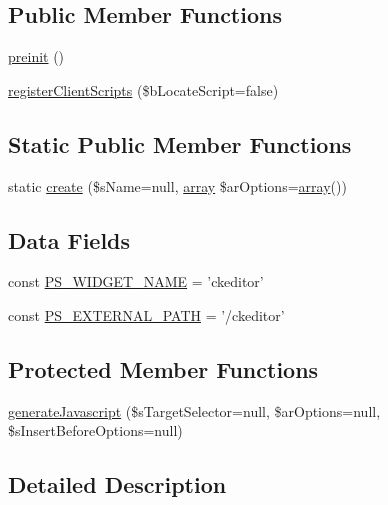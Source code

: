 \subsection*{Public Member Functions}
\begin{DoxyCompactItemize}
\item 
\hyperlink{classCPSCKEditorWidget_a2dc262e99b1c246b56f27626bfe699ff}{preinit} ()
\item 
\hyperlink{classCPSCKEditorWidget_ac02a66bde8e72e4909137bf748edf665}{registerClientScripts} (\$bLocateScript=false)
\end{DoxyCompactItemize}
\subsection*{Static Public Member Functions}
\begin{DoxyCompactItemize}
\item 
static \hyperlink{classCPSCKEditorWidget_a0ffc269a208148ade57c7eb608a4562a}{create} (\$sName=null, \hyperlink{list_8php_aa3205d038c7f8feb5c9f01ac4dfadc88}{array} \$arOptions=\hyperlink{list_8php_aa3205d038c7f8feb5c9f01ac4dfadc88}{array}())
\end{DoxyCompactItemize}
\subsection*{Data Fields}
\begin{DoxyCompactItemize}
\item 
const \hyperlink{classCPSCKEditorWidget_ae357f9dc377f7de0d12010b2ced28cbc}{PS\_\-WIDGET\_\-NAME} = 'ckeditor'
\item 
const \hyperlink{classCPSCKEditorWidget_a8ccb5e1d65c091f944a6aa8c5be834ca}{PS\_\-EXTERNAL\_\-PATH} = '/ckeditor'
\end{DoxyCompactItemize}
\subsection*{Protected Member Functions}
\begin{DoxyCompactItemize}
\item 
\hyperlink{classCPSCKEditorWidget_a273c0dc58b59db25cfd5a37561bccec5}{generateJavascript} (\$sTargetSelector=null, \$arOptions=null, \$sInsertBeforeOptions=null)
\end{DoxyCompactItemize}


\subsection{Detailed Description}



